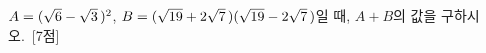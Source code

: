 $A=(\sqrt{6}-\sqrt{3}\mkern3mu )^2$, $B=(\sqrt{19}+2\sqrt{7}\mkern3mu )(\sqrt{19}-2\sqrt{7}\mkern3mu )$일 때, $A+B$의 값을 구하시오.~\mbox{\mbox{[7점]}}
